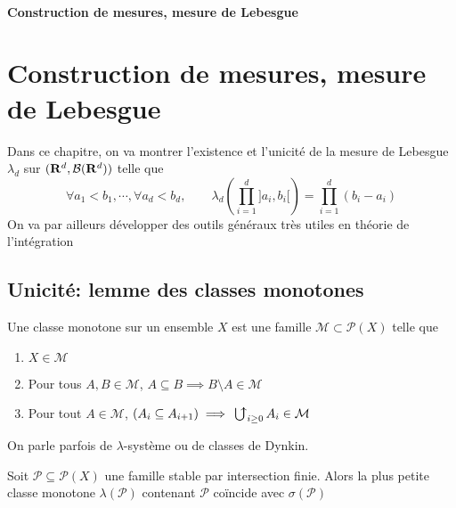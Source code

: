 \ifsolo
    ~

    \vspace{1cm}

    \begin{center}
        \textbf{\LARGE Construction de mesures, mesure de Lebesgue} \\[1em]
    \end{center}
    \tableofcontents
\else
    \chapter{Construction de mesures, mesure de Lebesgue}

    \minitoc
\fi
\thispagestyle{empty}

Dans ce chapitre, on va montrer l'existence et l'unicité de la mesure de Lebesgue $\lambda_d$ sur  $(\mathbf R^d, \mathcal  B(\mathbf R^d))$ telle que \[
    \forall  a_1<b_1, \cdots , \forall  a_d<b_d, \qquad  \lambda_d \left( \prod_{i=1}^d ]a_i, b_i[ \right)= \prod_{i=1}^{d} (b_i-a_i) 
\]
On va par ailleurs développer des outils généraux très utiles en théorie de l'intégration

\section{Unicité: lemme des classes monotones}

\begin{dfn}
    Une classe monotone sur un ensemble $X$ est une famille  $\mathcal  M\subset \mathcal  P(X)$ telle que \begin{enumerate}
        \item $X \in  \mathcal  M$
        \item Pour tous $A, B \in  \mathcal  M$, $A\subseteq B \implies B \setminus A \in  \mathcal  M$
        \item Pour tout  $A \in  \mathcal  M$, $(A_i\subseteq A_{i+1})\implies \ubigcup_{i\geq 0}A_i \in  \mathcal  M$
    \end{enumerate}
    On parle parfois de $\lambda$-système ou de classes de Dynkin.
\end{dfn}

\begin{lmm}
     Soit $\mathcal  P\subseteq \mathcal  P(X)$ une famille stable par intersection finie\footnotemark. Alors la plus petite classe monotone $\lambda(\mathcal  P)$ contenant $\mathcal  P$ coïncide avec $\sigma(\mathcal  P)$
\end{lmm}

